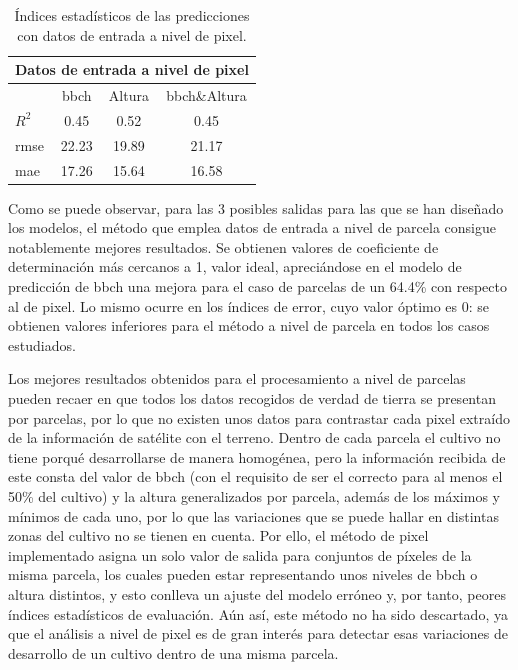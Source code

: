\begin{table}[h]
\centering
\begin{tabular}{lccc}
\multicolumn{4}{c}{Datos de entrada a nivel de pixel}                            \\ \hline \hline
\multicolumn{1}{l|}{}                            & \gls{bbch}  & Altura & \gls{bbch}\&Altura \\ \cline{2-4} 
\multicolumn{1}{l|}{$R^2$}                       & 0.45  & 0.52   & 0.45         \\
\multicolumn{1}{l|}{\gls{rmse}} 				 & 22.23 & 19.89  & 21.17        \\
\multicolumn{1}{l|}{\gls{mae}}  				 & 17.26 & 15.64  & 16.58       
\end{tabular}
\caption{Índices estadísticos de las predicciones con datos de entrada a nivel de pixel.\label{tab:errorpx}}
\end{table}

\par Como se puede observar, para las 3 posibles salidas para las que se han diseñado los modelos, el método que emplea datos de entrada a nivel de parcela consigue notablemente mejores resultados. Se obtienen valores de coeficiente de determinación más cercanos a 1, valor ideal, apreciándose en el modelo de predicción de \gls{bbch} una mejora para el caso de parcelas de un 64.4\% con respecto al de pixel. Lo mismo ocurre en los índices de error, cuyo valor óptimo es 0: se obtienen valores inferiores para el método a nivel de parcela en todos los casos estudiados.
\\
\par Los mejores resultados obtenidos para el procesamiento a nivel de parcelas pueden recaer en que todos los datos recogidos de verdad de tierra se presentan por parcelas, por lo que no existen unos datos para contrastar cada pixel extraído de la información de satélite con el terreno. Dentro de cada parcela el cultivo no tiene porqué desarrollarse de manera homogénea, pero la información recibida de este consta del valor de \gls{bbch} (con el requisito de ser el correcto para al menos el 50\% del cultivo) y la altura generalizados por parcela, además de los máximos y mínimos de cada uno, por lo que las variaciones que se puede hallar en distintas zonas del cultivo no se tienen en cuenta. Por ello, el método de pixel implementado asigna un solo valor de salida para conjuntos de píxeles de la misma parcela, los cuales pueden estar representando unos niveles de \gls{bbch} o altura distintos, y esto conlleva un ajuste del modelo erróneo y, por tanto, peores índices estadísticos de evaluación. Aún así, este método no ha sido descartado, ya que el análisis a nivel de pixel es de gran interés para detectar esas variaciones de desarrollo de un cultivo dentro de una misma parcela. 